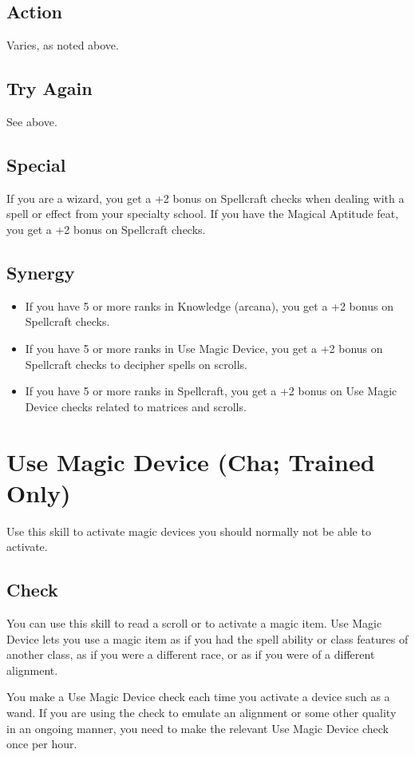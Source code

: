 \subsection{Action}
Varies, as noted above.
\subsection{Try Again}
See above.
\subsection{Special}
If you are a wizard, you get a +2 bonus on Spellcraft checks when dealing with a spell or effect from your specialty school. 
If you have the Magical Aptitude feat, you get a +2 bonus on Spellcraft checks.
\subsection{Synergy}
\begin{itemize}
 \item If you have 5 or more ranks in Knowledge (arcana), you get a +2 bonus on Spellcraft checks.
 \item If you have 5 or more ranks in Use Magic Device, you get a +2 bonus on Spellcraft checks to decipher spells on scrolls.
 \item If you have 5 or more ranks in Spellcraft, you get a +2 bonus on Use Magic Device checks related to matrices and scrolls.
\end{itemize}

\section[Use Magic Device]{Use Magic Device (Cha; Trained Only)}
\label{sec:UseMagicDevice}
Use this skill to activate magic devices you should normally not be able to activate.
\subsection{Check}
You can use this skill to read a scroll or to activate a magic item. Use Magic Device lets you use a magic item as if you had the spell ability or class features of another class, as if you were a different race, or as if you were of a different alignment.

You make a Use Magic Device check each time you activate a device such as a wand. If you are using the check to emulate an alignment or some other quality in an ongoing manner, you need to make the relevant Use Magic Device check once per hour.

